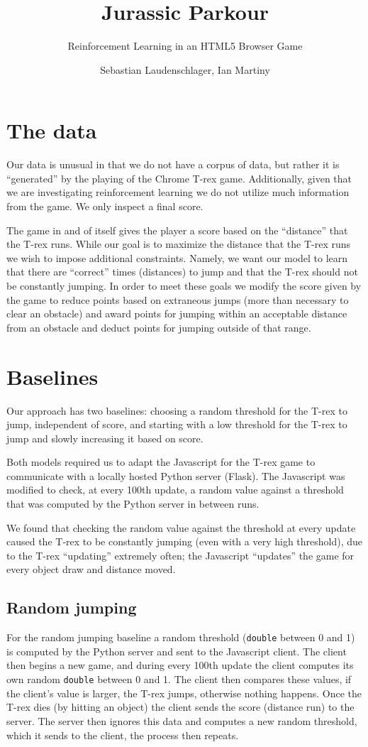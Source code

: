\documentclass{scrartcl}
\title{Jurassic Parkour}
\subtitle{Reinforcement Learning in an HTML5 Browser Game}
\author{Sebastian Laudenschlager, Ian Martiny}
\begin{document}
\maketitle

\section{The data}

Our data is unusual in that we do not have a corpus of data, but rather it is
``generated'' by the playing of the Chrome T-rex game. Additionally, given that
we are investigating reinforcement learning we do not utilize much information
from the game. We only inspect a final score.

The game in and of itself gives the player a score based on the ``distance''
that the T-rex runs. While our goal is to maximize the distance that the T-rex
runs we wish to impose additional constraints. Namely, we want our model to
learn that there are ``correct'' times (distances) to jump and that the T-rex
should not be constantly jumping. In order to meet these goals we modify the
score given by the game to reduce points based on extraneous jumps (more than
necessary to clear an obstacle) and award points for jumping within an
acceptable distance from an obstacle and deduct points for jumping outside of that
range.

\section{Baselines}

Our approach has two baselines: choosing a random threshold for the T-rex to
jump, independent of score, and starting with a low threshold for the T-rex to
jump and slowly increasing it based on score.

Both models required us to adapt the Javascript for the T-rex game to
communicate with a locally hosted Python server (Flask). The Javascript was
modified to check, at every 100th update, a random value against a threshold
that was computed by the Python server in between runs.

We found that checking the random value against the threshold at every update
caused the T-rex to be constantly jumping (even with a very high threshold), due
to the T-rex ``updating'' extremely often; the Javascript ``updates'' the game for every object draw and distance moved.

\subsection{Random jumping}
For the random jumping baseline a random threshold (\texttt{double} between 0
and 1) is computed by the Python server and sent to the Javascript client. The
client then begins a new game, and during every 100th update the client computes
its own random \texttt{double} between 0 and 1. The client then compares these
values, if the client's value is larger, the T-rex jumps, otherwise nothing
happens. Once the T-rex dies (by hitting an object) the client sends the score
(distance run) to the server. The server then ignores this data and computes a
new random threshold, which it sends to the client, the process then repeats.
\end{document}

